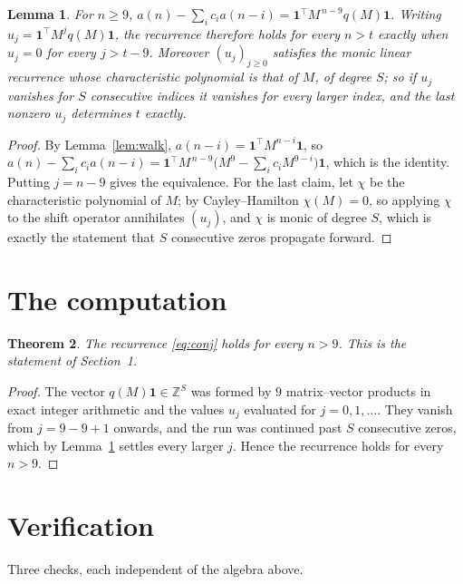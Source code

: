 \documentclass[11pt,a4paper]{article}
\theoremstyle{plain}
\newtheorem{theorem}{Theorem}
\newtheorem{lemma}[theorem]{Lemma}
\theoremstyle{definition}
\begin{document}
\begin{lemma}\label{lem:crit}
For $n\ge9$,
$a(n)-\sum_i c_i a(n-i)=\mathbf{1}^{\!\top}M^{\,n-9}q(M)\mathbf{1}$. Writing
$u_j=\mathbf{1}^{\!\top}M^{j}q(M)\mathbf{1}$, the recurrence therefore holds for every
$n>t$ exactly when $u_j=0$ for every $j>t-9$. Moreover $(u_j)_{j\ge0}$ satisfies the
monic linear recurrence whose characteristic polynomial is that of $M$, of degree $S$; so
if $u_j$ vanishes for $S$ consecutive indices it vanishes for every larger index, and the
last nonzero $u_j$ determines $t$ exactly.
\end{lemma}

\begin{proof}
By Lemma~\ref{lem:walk}, $a(n-i)=\mathbf{1}^{\!\top}M^{n-i}\mathbf{1}$, so
$a(n)-\sum_i c_i a(n-i)
=\mathbf{1}^{\!\top}M^{\,n-9}\bigl(M^{9}-\sum_i c_i M^{9-i}\bigr)
\mathbf{1}$, which is the identity. Putting $j=n-9$ gives the equivalence. For the
last claim, let $\chi$ be the characteristic polynomial of $M$; by Cayley--Hamilton
$\chi(M)=0$, so applying $\chi$ to the shift operator annihilates $(u_j)$, and $\chi$ is
monic of degree $S$, which is exactly the statement that $S$ consecutive zeros propagate
forward.
\end{proof}

\section{The computation}

\begin{theorem}
The recurrence \eqref{eq:conj} holds for every $n>9$. This is the statement of
Section~1.
\end{theorem}

\begin{proof}
The vector $q(M)\mathbf{1}\in\mathbb{Z}^{S}$ was formed by $9$ matrix--vector
products in exact integer arithmetic and the values $u_j$ evaluated for
$j=0,1,\dots$. They vanish from $j=9-9+1$ onwards, and the run was continued past
$S$ consecutive zeros, which by Lemma~\ref{lem:crit} settles every larger $j$. Hence the
recurrence holds for every $n>9$.
\end{proof}

\section{Verification}

Three checks, each independent of the algebra above.
\end{document}

